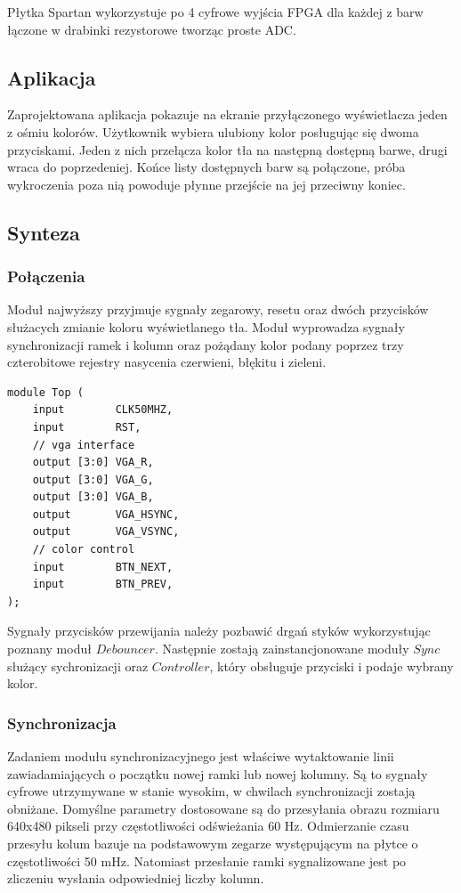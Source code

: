 \documentclass[a4paper,12pt]{article}
\begin{document}
Płytka Spartan wykorzystuje po 4 cyfrowe wyjścia FPGA dla każdej z barw łączone w drabinki rezystorowe tworząc proste ADC.

\subsection{Aplikacja}
Zaprojektowana aplikacja pokazuje na ekranie przyłączonego wyświetlacza jeden z ośmiu kolorów. Użytkownik wybiera ulubiony kolor posługując się dwoma przyciskami. Jeden z nich przełącza kolor tła na następną dostępną barwe, drugi wraca do poprzedeniej. Końce listy dostępnych barw są połączone, próba wykroczenia poza nią powoduje płynne przejście na jej przeciwny koniec.

\subsection{Synteza}

\subsubsection{Połączenia}

Moduł najwyższy przyjmuje sygnały zegarowy, resetu oraz dwóch przycisków służacych zmianie koloru wyświetlanego tła. Moduł wyprowadza sygnały synchronizacji ramek i kolumn oraz pożądany kolor podany poprzez trzy czterobitowe rejestry nasycenia czerwieni, błękitu i zieleni.

\begin{lstlisting}[label=Topvga,caption=Top.v]
module Top (
    input        CLK50MHZ,
    input        RST,
    // vga interface
    output [3:0] VGA_R,
    output [3:0] VGA_G,
    output [3:0] VGA_B,
    output       VGA_HSYNC,
    output       VGA_VSYNC,
    // color control
    input        BTN_NEXT,
    input        BTN_PREV,
);
\end{lstlisting}

Sygnały przycisków przewijania należy pozbawić drgań styków wykorzystując poznany moduł $Debouncer$. Następnie zostają zainstancjonowane moduły $Sync$ służący sychronizacji oraz $Controller$, który obsługuje przyciski i podaje wybrany kolor.

\subsubsection{Synchronizacja}
Zadaniem modułu synchronizacyjnego jest właściwe wytaktowanie linii zawiadamiających o początku nowej ramki lub nowej kolumny. Są to sygnały cyfrowe utrzymywane w stanie wysokim, w chwilach synchronizacji zostają obniżane. Domyślne parametry dostosowane są do przesyłania obrazu rozmiaru 640x480 pikseli przy częstotliwości odświeżania 60 Hz. Odmierzanie czasu przesyłu kolum  bazuje na podstawowym zegarze występującym na płytce o częstotliwości 50 mHz. Natomiast przesłanie ramki sygnalizowane jest po zliczeniu wysłania odpowiedniej liczby kolumn.
\end{document}
